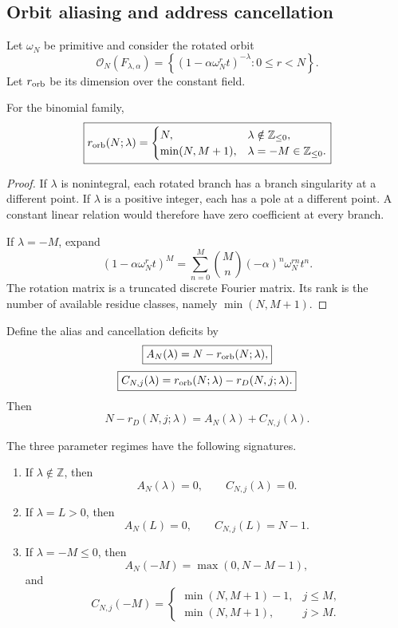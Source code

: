 \subsection{Orbit aliasing and address cancellation}
\label{subsec:block09-alias-cancellation}

Let $\omega_N$ be primitive and consider the rotated orbit
\[
 \mathcal O_N(F_{\lambda,\alpha})
 =
 \left
 \{(1-\alpha\omega_N^rt)^{-\lambda}:0\leq r<N\right\}.
\]
Let $r_{\rm orb}$ be its dimension over the constant field.

\begin{theorem}
\label{thm:block09-orbit-rank}
For the binomial family,
\[
 \boxed{
 r_{\rm orb}(N;\lambda)
 =
 \begin{cases}
 N,&\lambda\notin\mathbb Z_{\leq0},\\
 \min(N,M+1),&\lambda=-M\in\mathbb Z_{\leq0}.
 \end{cases}}
\]
\end{theorem}

\begin{proof}
If $\lambda$ is nonintegral, each rotated branch has a branch singularity at a different point.  If $\lambda$ is a positive integer, each has a pole at a different point.  A constant linear relation would therefore have zero coefficient at every branch.

If $\lambda=-M$, expand
\[
 (1-\alpha\omega_N^rt)^M
 =
 \sum_{n=0}^{M}
 \binom Mn(-\alpha)^n\omega_N^{rn}t^n.
\]
The rotation matrix is a truncated discrete Fourier matrix.  Its rank is the number of available residue classes, namely $\min(N,M+1)$.
\end{proof}

Define the alias and cancellation deficits by
\[
 \boxed{
 A_N(\lambda)=N-r_{\rm orb}(N;\lambda),}
\]
\[
 \boxed{
 C_{N,j}(\lambda)
 =
 r_{\rm orb}(N;\lambda)
 -r_D(N,j;\lambda).}
\]
Then
\[
 \boxed{
 N-r_D(N,j;\lambda)
 =
 A_N(\lambda)+C_{N,j}(\lambda).}
\]

\begin{corollary}
\label{cor:block09-defect-formulas}
The three parameter regimes have the following signatures.

\begin{enumerate}
\item If $\lambda\notin\mathbb Z$, then
\[
 A_N(\lambda)=0,
 \qquad
 C_{N,j}(\lambda)=0.
\]
\item If $\lambda=L>0$, then
\[
 A_N(L)=0,
 \qquad
 C_{N,j}(L)=N-1.
\]
\item If $\lambda=-M\leq0$, then
\[
 A_N(-M)=\max(0,N-M-1),
\]
and
\[
 C_{N,j}(-M)
 =
 \begin{cases}
 \min(N,M+1)-1,&j\leq M,\\
 \min(N,M+1),&j>M.
 \end{cases}
\]
\end{enumerate}
\end{corollary}

